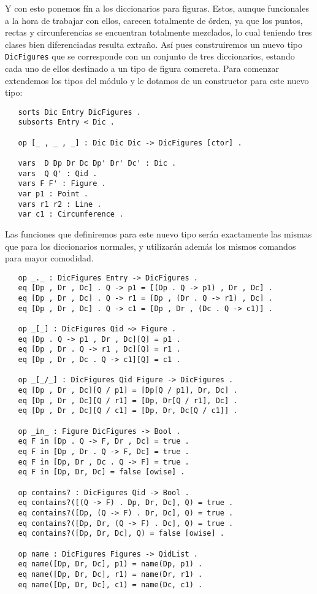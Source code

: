 Y con esto ponemos fín a los diccionarios para figuras. Estos, aunque funcionales a la hora de trabajar con ellos, carecen totalmente de órden, ya que los puntos, rectas y circunferencias se encuentran totalmente mezclados, lo cual teniendo tres clases bien diferenciadas resulta extraño. Así pues construiremos un nuevo tipo \texttt{DicFigures} que se corresponde con un conjunto de tres diccionarios, estando cada uno de ellos destinado a un tipo de figura comcreta. Para comenzar extendemos los tipos del módulo y le dotamos de un constructor para este nuevo tipo: \par

{\codesize
\begin{verbatim}
   sorts Dic Entry DicFigures .
   subsorts Entry < Dic .

   op [_ , _ , _] : Dic Dic Dic -> DicFigures [ctor] .

   vars  D Dp Dr Dc Dp' Dr' Dc' : Dic .
   vars  Q Q' : Qid .
   vars F F' : Figure .
   var p1 : Point .
   vars r1 r2 : Line .
   var c1 : Circumference .
\end{verbatim}
}

Las funciones que definiremos para este nuevo tipo serán exactamente las mismas que para los diccionarios normales, y utilizarán además los mismos comandos para mayor comodidad. \par

{\codesize
\begin{verbatim}
   op _._ : DicFigures Entry -> DicFigures .
   eq [Dp , Dr , Dc] . Q -> p1 = [(Dp . Q -> p1) , Dr , Dc] .
   eq [Dp , Dr , Dc] . Q -> r1 = [Dp , (Dr . Q -> r1) , Dc] .
   eq [Dp , Dr , Dc] . Q -> c1 = [Dp , Dr , (Dc . Q -> c1)] .

   op _[_] : DicFigures Qid ~> Figure .
   eq [Dp . Q -> p1 , Dr , Dc][Q] = p1 .
   eq [Dp , Dr . Q -> r1 , Dc][Q] = r1 .
   eq [Dp , Dr , Dc . Q -> c1][Q] = c1 . 

   op _[_/_] : DicFigures Qid Figure -> DicFigures .
   eq [Dp , Dr , Dc][Q / p1] = [Dp[Q / p1], Dr, Dc] .
   eq [Dp , Dr , Dc][Q / r1] = [Dp, Dr[Q / r1], Dc] .
   eq [Dp , Dr , Dc][Q / c1] = [Dp, Dr, Dc[Q / c1]] .

   op _in_ : Figure DicFigures -> Bool .
   eq F in [Dp . Q -> F, Dr , Dc] = true .
   eq F in [Dp , Dr . Q -> F, Dc] = true .
   eq F in [Dp, Dr , Dc . Q -> F] = true .
   eq F in [Dp, Dr, Dc] = false [owise] .

   op contains? : DicFigures Qid -> Bool .
   eq contains?([(Q -> F) . Dp, Dr, Dc], Q) = true .
   eq contains?([Dp, (Q -> F) . Dr, Dc], Q) = true .
   eq contains?([Dp, Dr, (Q -> F) . Dc], Q) = true .
   eq contains?([Dp, Dr, Dc], Q) = false [owise] .

   op name : DicFigures Figures -> QidList .
   eq name([Dp, Dr, Dc], p1) = name(Dp, p1) .
   eq name([Dp, Dr, Dc], r1) = name(Dr, r1) .
   eq name([Dp, Dr, Dc], c1) = name(Dc, c1) .
\end{verbatim}
}

